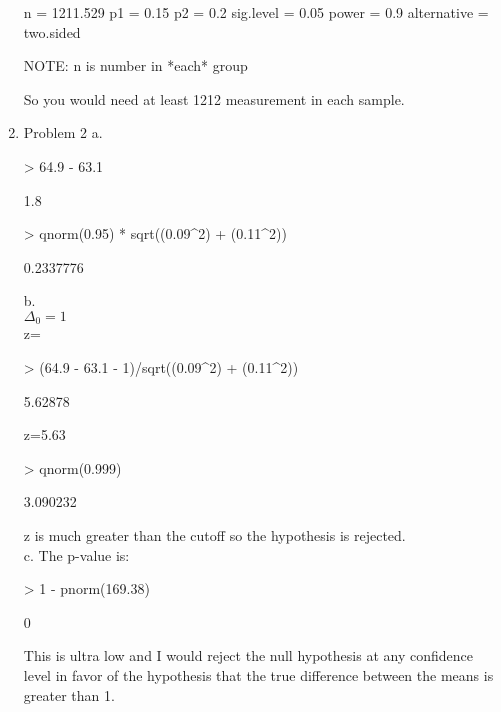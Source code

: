 \documentclass[11pt,letterpaper]{article}
\begin{document}
\begin{enumerate}
\begin{Schunk}
\begin{Soutput}
              n = 1211.529
             p1 = 0.15
             p2 = 0.2
      sig.level = 0.05
          power = 0.9
    alternative = two.sided

 NOTE: n is number in *each* group 
\end{Soutput}
\end{Schunk}
So you would need at least 1212 measurement in each sample.\\

\item Problem 2
a.
\begin{Schunk}
\begin{Sinput}
> 64.9 - 63.1
\end{Sinput}
\begin{Soutput}
[1] 1.8
\end{Soutput}
\begin{Sinput}
> qnorm(0.95) * sqrt((0.09^2) + (0.11^2))
\end{Sinput}
\begin{Soutput}
[1] 0.2337776
\end{Soutput}
\end{Schunk}
b.\\
$\Delta_0=1$\\
z=
\begin{Schunk}
\begin{Sinput}
> (64.9 - 63.1 - 1)/sqrt((0.09^2) + (0.11^2))
\end{Sinput}
\begin{Soutput}
[1] 5.62878
\end{Soutput}
\end{Schunk}
z=5.63
\begin{Schunk}
\begin{Sinput}
> qnorm(0.999)
\end{Sinput}
\begin{Soutput}
[1] 3.090232
\end{Soutput}
\end{Schunk}
z is much greater than the cutoff so the hypothesis is rejected.\\

c. The p-value is:
\begin{Schunk}
\begin{Sinput}
> 1 - pnorm(169.38)
\end{Sinput}
\begin{Soutput}
[1] 0
\end{Soutput}
\end{Schunk}
This is ultra low and I would reject the null hypothesis at any confidence level in favor of the hypothesis that the true difference between the means is greater than 1.\\


\end{enumerate}
\end{document}
